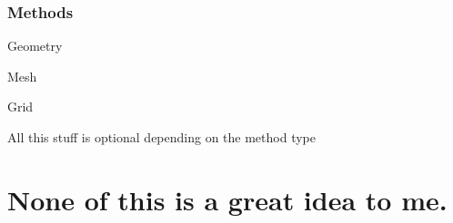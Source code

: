 \subsubsection*{Methods}


\begin{DoxyItemize}
\item Geometry
\item Mesh
\item Grid
\end{DoxyItemize}

All this stuff is optional depending on the method type

\section*{None of this is a great idea to me.}